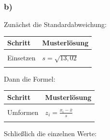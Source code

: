 \documentclass[
  11pt,
  ngerman,
  a4paper,
]{report}
\begin{document}
\hypertarget{b-8}{%
\subsubsection{b)}\label{b-8}}

Zunächst die Standardabweichung:

\begin{table}[H]
\centering
\begin{tabular}{ll}
\toprule
\textbf{Schritt} & \textbf{Musterlösung}\\
\midrule
\cellcolor{gray!6}{Formel} & \cellcolor{gray!6}{$s=\sqrt{s^2}$}\\
Einsetzen & $s=\sqrt{13{,}02}$\\
\cellcolor{gray!6}{Ergebnis} & \cellcolor{gray!6}{$s\approx3{,}61$}\\
\bottomrule
\end{tabular}
\end{table}

Dann die Formel:

\begin{table}[H]
\centering
\begin{tabular}{l>{\raggedright\arraybackslash}p{8cm}}
\toprule
\textbf{Schritt} & \textbf{Musterlösung}\\
\midrule
\cellcolor{gray!6}{Formel} & \cellcolor{gray!6}{$z_{i} = \frac{x_{i} - \bar{x}}{s}$}\\
Umformen & $z_{i} = \frac{x_{i} - \bar{x}}{s}$\\
\cellcolor{gray!6}{Einsetzen} & \cellcolor{gray!6}{$x_{i} = z_{i} \cdot 3{,}61 + 221{,}54$}\\
\bottomrule
\end{tabular}
\end{table}

Schließlich die einzelnen Werte:
\end{document}
